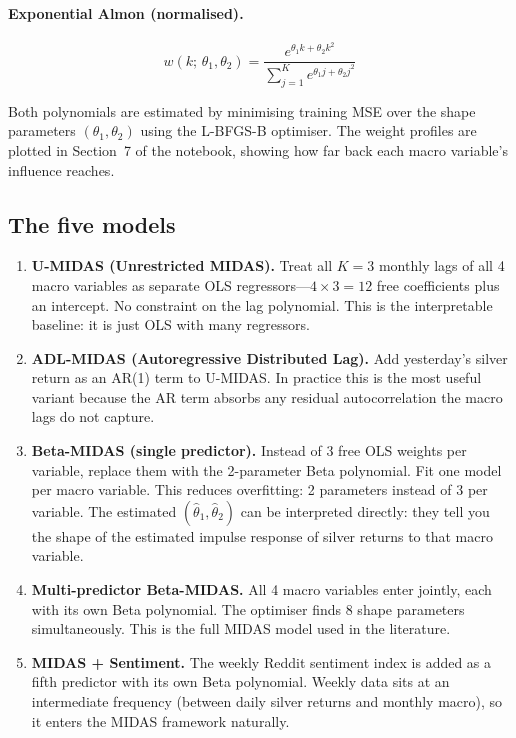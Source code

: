 \documentclass[12pt, a4paper]{article}
\begin{document}
\paragraph{Exponential Almon (normalised).}
\begin{equation}
  w(k;\, \theta_1, \theta_2) = \frac{e^{\theta_1 k + \theta_2 k^2}}
    {\sum_{j=1}^{K} e^{\theta_1 j + \theta_2 j^2}}
\end{equation}

Both polynomials are estimated by minimising training MSE over the shape parameters
$(\theta_1, \theta_2)$ using the L-BFGS-B optimiser. The weight profiles are plotted
in Section~7 of the notebook, showing how far back each macro variable's influence
reaches.

\subsection{The five models}

\begin{enumerate}

\item \textbf{U-MIDAS (Unrestricted MIDAS).} Treat all $K = 3$ monthly lags of all 4
  macro variables as separate OLS regressors---$4 \times 3 = 12$ free coefficients plus
  an intercept. No constraint on the lag polynomial. This is the interpretable baseline:
  it is just OLS with many regressors.

\item \textbf{ADL-MIDAS (Autoregressive Distributed Lag).} Add yesterday's silver
  return as an AR(1) term to U-MIDAS. In practice this is the most useful variant
  because the AR term absorbs any residual autocorrelation the macro lags do not
  capture.

\item \textbf{Beta-MIDAS (single predictor).} Instead of 3 free OLS weights per
  variable, replace them with the 2-parameter Beta polynomial. Fit one model per macro
  variable. This reduces overfitting: 2 parameters instead of 3 per variable.
  The estimated $(\hat{\theta}_1, \hat{\theta}_2)$ can be interpreted directly: they
  tell you the shape of the estimated impulse response of silver returns to that macro
  variable.

\item \textbf{Multi-predictor Beta-MIDAS.} All 4 macro variables enter jointly, each
  with its own Beta polynomial. The optimiser finds 8 shape parameters simultaneously.
  This is the full MIDAS model used in the literature.

\item \textbf{MIDAS + Sentiment.} The weekly Reddit sentiment index is added as a
  fifth predictor with its own Beta polynomial. Weekly data sits at an intermediate
  frequency (between daily silver returns and monthly macro), so it enters the MIDAS
  framework naturally.

\end{enumerate}
\end{document}
